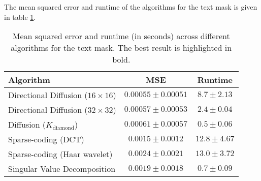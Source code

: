 The mean squared error and runtime of the algorithms for the text mask is given in table \ref{tbl:err_text}.



\begin{table}
	\centering
	\begin{tabular}{|l|c|c|}
		\hline
		\textbf{Algorithm} & \textbf{MSE} & \textbf{Runtime} \\ \hline \hline
		Directional Diffusion ($16 \times 16$) & $\mathbf{0.00055} \pm 0.00051$ & $8.7 \pm 2.13$ \\ \hline
		Directional Diffusion ($32 \times 32$) & $0.00057 \pm 0.00053$ & $2.4 \pm 0.04$ \\ \hline
		Diffusion ($K_{\text{diamond}}$) & $0.00061 \pm 0.00057$ & $\mathbf{0.5} \pm 0.06$ \\ \hline
		Sparse-coding (DCT) & $0.0015 \pm 0.0012$ & $12.8 \pm 4.67$ \\ \hline
		Sparse-coding (Haar wavelet) & $0.0024 \pm 0.0021$ & $13.0 \pm 3.72$ \\ \hline
		Singular Value Decomposition & $0.0019 \pm 0.0018$ & $0.7 \pm 0.09$ \\ \hline
	\end{tabular}
	\caption{Mean squared error and runtime (in seconds) across different algorithms for the text mask. The best result is highlighted in bold.}
	\label{tbl:err_text}
\end{table}


